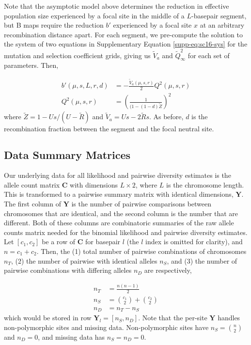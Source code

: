 \documentclass[11pt]{article}
\begin{document}
Note that the asymptotic model above determines the reduction in effective
population size experienced by a focal site in the middle of a $L$-basepair
segment, but B maps require the reduction $b'$ experienced by a focal site $x$
at an arbitrary recombination distance apart. For each segment, we pre-compute
the solution to the system of two equations in Supplementary Equation
\eqref{supp-eq:sc16-sys} for the mutation and selection coefficient grids,
giving us $\widetilde{V}_a$ and $\widetilde{Q}_\infty^2$ for each set of
parameters. Then, 

\begin{align} 
    b'(\mu, s, L, r, d) &= -\frac{\widetilde{V}_a(\mu, s, r)}{2} Q^2(\mu, s, r) \\
                        Q^2(\mu, s, r)&= \left(\frac{1}{(1-(1-d)\widetilde{Z}}\right)^2 
\end{align}
%
where $\widetilde{Z} = 1 - Us / (U-\widetilde{R})$ and $\widetilde{V}_a = Us - 2\widetilde{R}s$. As
before, $d$ is the recombination fraction between the segment and the focal
neutral site.

\subsection{Data Summary Matrices}
\label{supp:data-summary}

Our underlying data for all likelihood and pairwise diversity estimates is the
allele count matrix $\mathbf{C}$ with dimensions $L \times 2$, where $L$ is the
chromosome length. This is transformed to a pairwise summary matrix with
identical dimensions, $\mathbf{Y}$. The first column of $\mathbf{Y}$ is the
number of pairwise comparisons between chromosomes that are identical, and the
second column is the number that are different. Both of these columns are
combinatoric summaries of the raw allele counts matrix needed for the binomial
likelihood and pairwise diversity estimates. Let $[c_1, c_2]$ be a row of
$\mathbf{C}$ for basepair $l$ (the $l$ index is omitted for clarity), and $n =
c_1 + c_2$. Then, the (1) total number of pairwise combinations of chromosomes
$n_T$, (2) the number of pairwise with identical alleles $n_S$, and (3) the
number of pairwise combinations with differing alleles $n_D$ are respectively,

\begin{align*}
  n_T &= \frac{n(n-1)}{2} \\
  n_S &= {c_1 \choose 2} + {c_2 \choose 2} \\
  n_D &= n_T - n_S
\end{align*}
%
which would be stored in row $\mathbf{Y}_l = [n_S, n_D]$. Note that the
per-site $\mathbf{Y}$ handles non-polymorphic sites and missing data.
Non-polymorphic sites have $n_S = {n \choose 2}$ and $n_D = 0$, and missing
data has $n_S = n_D = 0$.
\end{document}
